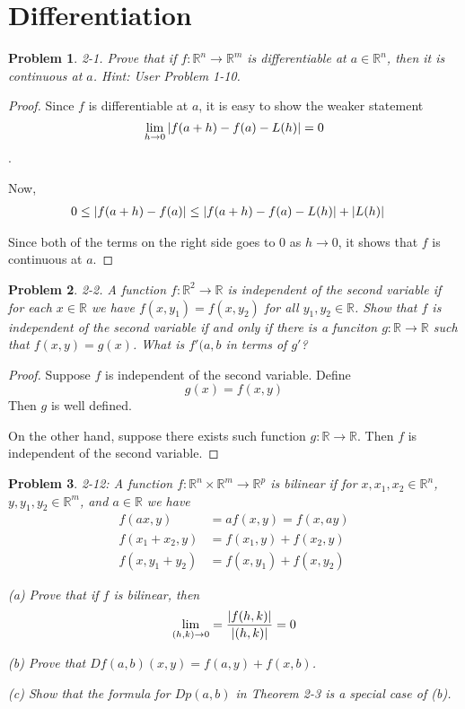 \documentclass[12pt]{book}
\newtheorem*{problem*}{Problem}
\begin{document}
\section{Differentiation}
\begin{problem*}
  2-1. Prove that if $f : \mathbb{R}^n \to \mathbb{R}^m$ is differentiable at $a \in \mathbb{R}^n$, then it is continuous at $a$. Hint: User Problem 1-10. 
\end{problem*}

\begin{proof}
  Since $f$ is differentiable at $a$, it is easy to show the weaker statement
  \[
  \lim_{h\to 0} \abs{f(a+h) - f(a) - L(h)}  = 0
  \].

  Now,
  \begin{align*}
    0 \le \abs{f(a+h) - f(a) } & \le \abs{f(a+h) - f(a) - L(h)} + \abs{L(h)}
  \end{align*}

  Since both of the terms on the right side goes to $0$ as $h \to 0$, it shows that $f$ is continuous at $a$. 
\end{proof}

\begin{problem*}
  2-2. A function $f : \mathbb{R}^2 \to \mathbb{R}$ is independent of the second variable if for each $x \in \mathbb{R}$ we have $f(x, y_1) = f(x, y_2)$ for all $y_1, y_2 \in \mathbb{R}$. Show that $f$ is independent of the second variable if and only if there is a funciton $g : \mathbb{R} \to \mathbb{R}$ such that $f(x, y) = g(x)$. What is $f'(a,b$ in terms of $g'$?
\end{problem*}

\begin{proof}
  Suppose $f$ is independent of the second variable. Define
  \[
  g(x) = f(x, y) 
  \]
  Then $g$ is well defined.

  On the other hand, suppose there exists such function $g : \mathbb{R} \to \mathbb{R}$. Then $f$ is independent of the second variable. 
\end{proof}

\begin{problem*}
  2-12: A function $f : \mathbb{R}^n \times \mathbb{R}^m \to \mathbb{R}^p$ is bilinear if for $x, x_1, x_2 \in \mathbb{R}^n$, $y, y_1, y_2 \in \mathbb{R}^m$, and $a \in \mathbb{R}$ we have
    \begin{align*}
    f(ax, y) &= af(x,y) = f(x, ay)\\
    f(x_1 + x_2 , y) &= f(x_1, y) + f(x_2, y)\\
    f(x, y_1 + y_2) &= f(x, y_1) + f(x, y_2)
  \end{align*}

    (a) Prove that if $f$ is bilinear, then
    \[
    \lim_{(h,k) \to 0} = \frac{\abs{f(h,k)}}{\abs{(h,k)}} = 0
    \]

    (b) Prove that $Df(a,b)(x,y) = f(a,y) + f(x,b)$.

    (c) Show that the formula for $Dp(a,b)$ in Theorem 2-3 is a special case of (b). 
      
\end{problem*}
\end{document}
